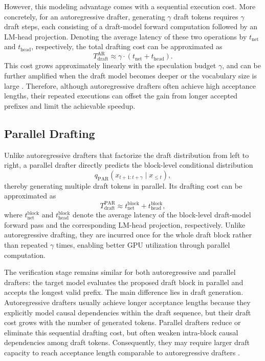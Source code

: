 \documentclass{llmxive}
\begin{document}
However, this modeling advantage comes with a sequential execution cost. More concretely, for an autoregressive drafter, generating \(\gamma\) draft tokens requires \(\gamma\) draft steps, each consisting of a draft-model forward computation followed by an LM-head projection. Denoting the average latency of these two operations by \(t_{\mathrm{net}}\) and \(t_{\mathrm{head}}\), respectively, the total drafting cost can be approximated as
\[
T_{\mathrm{draft}}^{\mathrm{AR}}
\approx
\gamma \cdot
\left(
t_{\mathrm{net}} + t_{\mathrm{head}}
\right).
\]
This cost grows approximately linearly with the speculation budget \(\gamma\), and can be further amplified when the draft model becomes deeper or the vocabulary size is large \citep{zhao2025fr,yan2025scaling}. Therefore, although autoregressive drafters often achieve high acceptance lengths, their repeated executions can offset the gain from longer accepted prefixes and limit the achievable speedup.

\subsection{Parallel Drafting}

Unlike autoregressive drafters that factorize the draft distribution from left to right, a parallel drafter \citep{chen2026dflash,liu2026dart} directly predicts the block-level conditional distribution
\[
q_{\mathrm{PAR}}(x_{t+1:t+\gamma} \mid x_{\le t}),
\]
thereby generating multiple draft tokens in parallel. Its drafting cost can be approximated as
\[
T_{\mathrm{draft}}^{\mathrm{PAR}}
\approx
t_{\mathrm{net}}^{\mathrm{block}} + t_{\mathrm{head}}^{\mathrm{block}},
\]
where \(t_{\mathrm{net}}^{\mathrm{block}}\) and \(t_{\mathrm{head}}^{\mathrm{block}}\) denote the average latency of the block-level draft-model forward pass and the corresponding LM-head projection, respectively. Unlike autoregressive drafting, they are incurred once for the whole draft block rather than repeated \(\gamma\) times, enabling better GPU utilization through parallel computation.

The verification stage remains similar for both autoregressive and parallel drafters: the target model evaluates the proposed draft block in parallel and accepts the longest valid prefix. The main difference lies in draft generation. Autoregressive drafters usually achieve longer acceptance lengths because they explicitly model causal dependencies within the draft sequence, but their draft cost grows with the number of generated tokens. Parallel drafters reduce or eliminate this sequential drafting cost, but often weaken intra-block causal dependencies among draft tokens. Consequently, they may require larger draft capacity to reach acceptance length comparable to autoregressive drafters \citep{chen2026dflash}.
\end{document}
